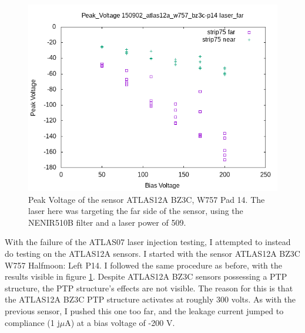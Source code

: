 \documentclass{report}
\begin{document}
            \begin{figure}[h] 
                \includegraphics[height=.4\textheight]{Peak_Voltage__150902_atlas12a_w757_bz3c-p14__laser_far}
                \centering
                \caption{ Peak Voltage of the sensor ATLAS12A BZ3C, W757 Pad 14. The laser here was targeting the far side of the sensor, using the NENIR510B filter and a laser power of 509. }
                \label{fig:Peak_Voltage__150902_atlas12a_w757_bz3c-p14__laser_far}
            \end{figure}

            With the failure of the ATLAS07 laser injection testing, I attempted to instead do testing on the ATLAS12A sensors. I started with the sensor ATLAS12A BZ3C W757 Halfmoon: Left P14. I followed the same procedure as before, with the results visible in figure \ref{fig:Peak_Voltage__150902_atlas12a_w757_bz3c-p14__laser_far}. Despite ATLAS12A BZ3C sensors possessing a PTP structure, the PTP structure's effects are not visible. The reason for this is that the ATLAS12A BZ3C PTP structure activates at roughly 300 volts. As with the previous sensor, I pushed this one too far, and the leakage current jumped to compliance (1 j$\mu$A) at a bias voltage of -200 V.
\end{document}
